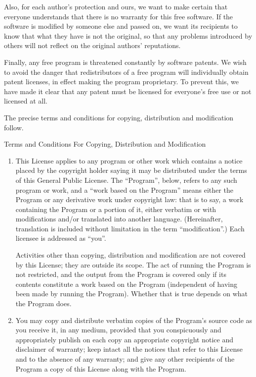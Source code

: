 \documentclass[12pt,openany,a4paper]{book}
\begin{document}
{Also, for each author's protection and ours, we want to make certain that
everyone understands that there is no warranty for this free software.  If
the software is modified by someone else and passed on, we want its
recipients to know that what they have is not the original, so that any
problems introduced by others will not reflect on the original authors'
reputations.

Finally, any free program is threatened constantly by software patents.
We wish to avoid the danger that redistributors of a free program will
individually obtain patent licenses, in effect making the program
proprietary.  To prevent this, we have made it clear that any patent must
be licensed for everyone's free use or not licensed at all.

The precise terms and conditions for copying, distribution and
modification follow.

\begin{center}
{\Large \sc Terms and Conditions For Copying, Distribution and
  Modification}
\end{center}


\begin{enumerate}

\addtocounter{enumi}{-1}

\item 

This License applies to any program or other work which contains a notice
placed by the copyright holder saying it may be distributed under the
terms of this General Public License.  The ``Program'', below, refers to
any such program or work, and a ``work based on the Program'' means either
the Program or any derivative work under copyright law: that is to say, a
work containing the Program or a portion of it, either verbatim or with
modifications and/or translated into another language.  (Hereinafter,
translation is included without limitation in the term ``modification''.)
Each licensee is addressed as ``you''.

Activities other than copying, distribution and modification are not
covered by this License; they are outside its scope.  The act of
running the Program is not restricted, and the output from the Program
is covered only if its contents constitute a work based on the
Program (independent of having been made by running the Program).
Whether that is true depends on what the Program does.

\item You may copy and distribute verbatim copies of the Program's source
  code as you receive it, in any medium, provided that you conspicuously
  and appropriately publish on each copy an appropriate copyright notice
  and disclaimer of warranty; keep intact all the notices that refer to
  this License and to the absence of any warranty; and give any other
  recipients of the Program a copy of this License along with the Program.


\end{enumerate}}
\end{document}
